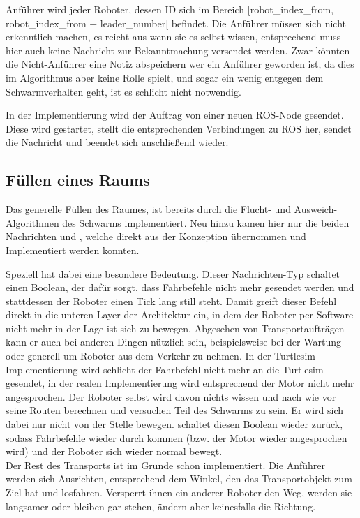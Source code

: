 Anführer wird jeder Roboter, dessen ID sich im Bereich [robot\_index\_from, robot\_index\_from + leader\_number[ befindet. Die Anführer müssen sich nicht erkenntlich machen, es reicht aus wenn sie es selbst wissen, entsprechend muss hier auch keine Nachricht zur Bekanntmachung versendet werden. Zwar könnten die Nicht-Anführer eine Notiz abspeichern wer ein Anführer geworden ist, da dies im Algorithmus aber keine Rolle spielt, und sogar ein wenig entgegen dem Schwarmverhalten geht, ist es schlicht nicht notwendig.

In der Implementierung wird der Auftrag von einer neuen \ac{ROS}-Node gesendet. Diese wird gestartet, stellt die entsprechenden Verbindungen zu \ac{ROS} her, sendet die Nachricht und beendet sich anschließend wieder.

\subsection*{Füllen eines Raums}

Das generelle Füllen des Raumes, ist bereits durch die Flucht- und Ausweich-Algorithmen des Schwarms implementiert. Neu hinzu kamen hier nur die beiden Nachrichten  und , welche direkt aus der Konzeption übernommen und Implementiert werden konnten.

Speziell  hat dabei eine besondere Bedeutung. Dieser Nachrichten-Typ schaltet einen Boolean, der dafür sorgt, dass Fahrbefehle nicht mehr gesendet werden und stattdessen der Roboter einen Tick lang still steht. Damit greift dieser Befehl direkt in die unteren Layer der Architektur ein, in dem der Roboter per Software nicht mehr in der Lage ist sich zu bewegen. Abgesehen von Transportaufträgen kann er auch bei anderen Dingen nützlich sein, beispielsweise bei der Wartung oder generell um Roboter aus dem Verkehr zu nehmen. In der Turtlesim-Implementierung wird schlicht der Fahrbefehl nicht mehr an die Turtlesim gesendet, in der realen Implementierung wird entsprechend der Motor nicht mehr angesprochen. Der Roboter selbst wird davon nichts wissen und nach wie vor seine Routen berechnen und versuchen Teil des Schwarms zu sein. Er wird sich dabei nur nicht von der Stelle bewegen.  schaltet diesen Boolean wieder zurück, sodass Fahrbefehle wieder durch kommen (bzw. der Motor wieder angesprochen wird) und der Roboter sich wieder normal bewegt.\\

Der Rest des Transports ist im Grunde schon implementiert. Die Anführer werden sich Ausrichten, entsprechend dem Winkel, den das Transportobjekt zum Ziel hat und losfahren. Versperrt ihnen ein anderer Roboter den Weg, werden sie langsamer oder bleiben gar stehen, ändern aber keinesfalls die Richtung.

